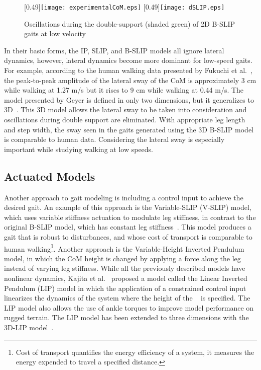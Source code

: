 \begin{figure}
	\centering
	[0.49\textwidth]{\texttt{[image: experimentalCoM.eps]}}%
	\hfill
	[0.49\textwidth]{\texttt{[image: dSLIP.eps]}}%
	\caption{Oscillations during the double-support (shaded green) of 2D B-SLIP gaits at low velocity} \label{fig:traj_compare}
\end{figure}

In their basic forms, the IP, SLIP, and B-SLIP models all ignore lateral dynamics, however, lateral dynamics become more dominant for low-speed gaits. For example, according to the human walking data presented by Fukuchi et al.~\cite{fukuchi2018public}, the peak-to-peak amplitude of the lateral sway of the CoM is approximately 3 cm while walking at 1.27 m/s but it rises to 9 cm while walking at 0.44 m/s. The model presented by Geyer is defined in only two dimensions, but it generalizes to 3D~\cite{liu2015dynamic,liu2016terrain}. This 3D model allows the lateral sway to be taken into consideration and oscillations during double support are eliminated. With appropriate leg length and step width, the sway seen in the gaits generated using the 3D B-SLIP model is comparable to human data. Considering the lateral sway is especially important while studying walking at low speeds. 

\subsection{Actuated Models}

Another approach to gait modeling is including a control input to achieve the desired gait. An example of this approach is the Variable-SLIP (V-SLIP) model, which uses variable stiffness actuation to modulate leg stiffness, in contrast to the original B-SLIP model, which has constant leg stiffness~\cite{visser2017bipedal}. This model produces a gait that is robust to disturbances, and whose cost of transport is comparable to human walking\footnote{Cost of transport quantifies the energy efficiency of a system, it measures the energy expended to travel a specified distance.}. Another approach is the Variable-Height Inverted Pendulum model, in which the CoM height is changed by applying a force along the leg~\cite{koolen2016balance} instead of varying leg stiffness. While all the previously described models have nonlinear dynamics, Kajita et al.~\cite{kajita1991study} proposed a model called the Linear Inverted Pendulum (LIP) model in which the application of a constrained control input linearizes the dynamics of the system where the height of the \com~ is specified. The LIP model also allows the use of ankle torques to improve model performance on rugged terrain. The LIP model has been extended to three dimensions with the 3D-LIP model~\cite{kajita20013d}.

